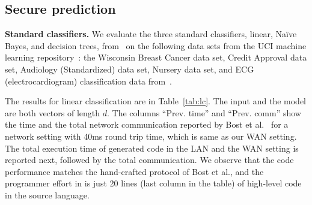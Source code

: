 \subsection{Secure prediction}
\noindent\textbf{Standard classifiers.}
We evaluate the three standard classifiers, linear, Na\"{i}ve Bayes, and
decision trees, from~\cite{shafindss} on the following data sets from the UCI
machine learning repository~\cite{uci}:
 the Wisconsin Breast Cancer data set, 
Credit Approval data set, Audiology (Standardized) data set, Nursery
data set, and ECG (electrocardiogram) classification data
from~\cite{barni}.

The results for linear
classification are in Table~\ref{tab:lc}.
The input and the model are both vectors of length $d$. 
The columns ``Prev. time'' and ``Prev. comm'' show the time and the total
network communication reported by Bost et al.~\cite{shafindss} for a
network setting with 40ms
round trip time, which is same as our WAN setting. The total execution
time
of \tool generated code in the LAN and the WAN setting is reported
next, followed by the total communication.
We observe that the \tool code performance matches the hand-crafted protocol of Bost
et al., and the programmer effort in \tool is just 20
lines (last column in the table) of high-level code in the \tool
source language. %


